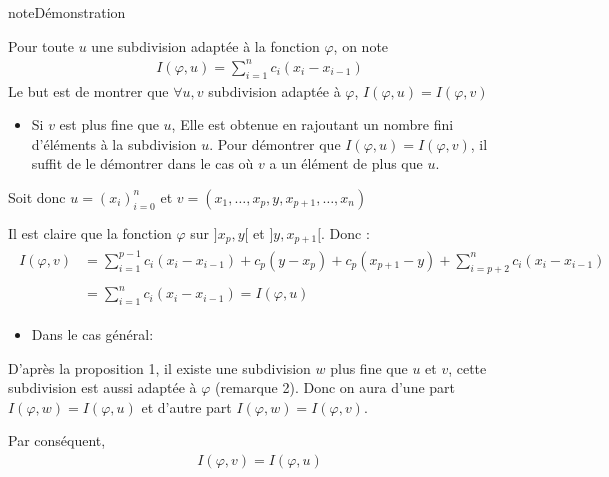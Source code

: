 \documentclass[letterpaper,10pt,french]{jupyterBook}
\begin{document}
\begin{sphinxadmonition}{note}{Démonstration}

\sphinxAtStartPar
Pour toute \(u\) une subdivision adaptée à la fonction \(\varphi\), on note
\begin{equation*}
\begin{split}
I(\varphi, u)= \sum_{i=1}^nc_i(x_i-x_{i-1})
\end{split}
\end{equation*}
\sphinxAtStartPar
Le but est de montrer que \(\forall u, v\) subdivision adaptée à \(\varphi\), \(I(\varphi, u)=I(\varphi, v)\)
\begin{itemize}
\item {} 
\sphinxAtStartPar
Si \(v\) est plus fine que \(u\),
Elle est obtenue en rajoutant un nombre fini d’éléments à la subdivision \(u\). Pour démontrer que \(I(\varphi, u)=I(\varphi, v)\), il suffit de le démontrer dans le cas où  \(v\) a un élément de plus que \(u\).

\end{itemize}

\sphinxAtStartPar
Soit donc \(u=(x_i)_{i=0}^n\) et \(v=(x_1, \ldots, x_p, y, x_{p+1}, \ldots, x_n)\)

\sphinxAtStartPar
Il est claire que la fonction \(\varphi\) sur \(]x_p, y[\) et \(]y, x_{p+1}[\). Donc :
\begin{equation*}
\begin{split}
\begin{aligned}
I(\varphi, v) & =  \sum_{i=1}^{p-1}c_i(x_i-x_{i-1})+c_p(y-x_p) + c_p(x_{p+1}-y) + \sum_{i=p+2}^{n}c_i(x_i-x_{i-1})  \\ \\
 & =  \sum_{i=1}^{n}c_i(x_i-x_{i-1}) = I(\varphi, u) 
\end{aligned}
\end{split}
\end{equation*}\begin{itemize}
\item {} 
\sphinxAtStartPar
Dans le cas général:

\end{itemize}

\sphinxAtStartPar
D’après la proposition 1, il existe une subdivision \(w\) plus fine que \(u\) et \(v\), cette subdivision est aussi adaptée à \(\varphi\) (remarque 2).
Donc on aura d’une part \(I(\varphi, w)=I(\varphi, u)\) et d’autre part \(I(\varphi, w)=I(\varphi, v)\).

\sphinxAtStartPar
Par conséquent,
\begin{equation*}
\begin{split}
I(\varphi, v)=I(\varphi, u)
\end{split}
\end{equation*}\end{sphinxadmonition}
\end{document}
